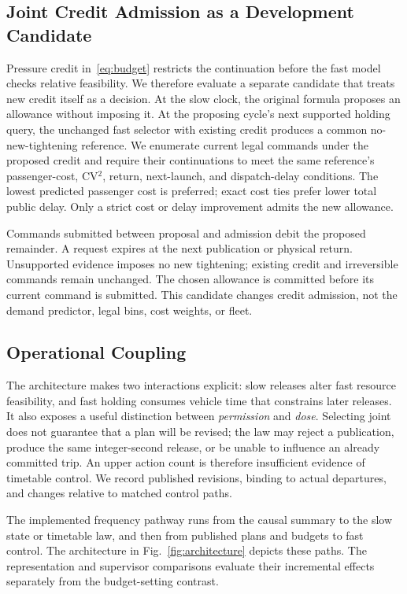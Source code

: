 \subsection{Joint Credit Admission as a Development Candidate}
Pressure credit in~\eqref{eq:budget} restricts the continuation before the fast model checks relative feasibility. We therefore evaluate a separate candidate that treats new credit itself as a decision. At the slow clock, the original formula proposes an allowance without imposing it. At the proposing cycle's next supported holding query, the unchanged fast selector with existing credit produces a common no-new-tightening reference. We enumerate current legal commands under the proposed credit and require their continuations to meet the same reference's passenger-cost, CV$^2$, return, next-launch, and dispatch-delay conditions. The lowest predicted passenger cost is preferred; exact cost ties prefer lower total public delay. Only a strict cost or delay improvement admits the new allowance.

Commands submitted between proposal and admission debit the proposed remainder. A request expires at the next publication or physical return. Unsupported evidence imposes no new tightening; existing credit and irreversible commands remain unchanged. The chosen allowance is committed before its current command is submitted. This candidate changes credit admission, not the demand predictor, legal bins, cost weights, or fleet.

\subsection{Operational Coupling}
The architecture makes two interactions explicit: slow releases alter fast resource feasibility, and fast holding consumes vehicle time that constrains later releases. It also exposes a useful distinction between \emph{permission} and \emph{dose}. Selecting joint does not guarantee that a plan will be revised; the law may reject a publication, produce the same integer-second release, or be unable to influence an already committed trip. An upper action count is therefore insufficient evidence of timetable control. We record published revisions, binding to actual departures, and changes relative to matched control paths.

The implemented frequency pathway runs from the causal summary to the slow state or timetable law, and then from published plans and budgets to fast control. The architecture in Fig.~\ref{fig:architecture} depicts these paths. The representation and supervisor comparisons evaluate their incremental effects separately from the budget-setting contrast.
